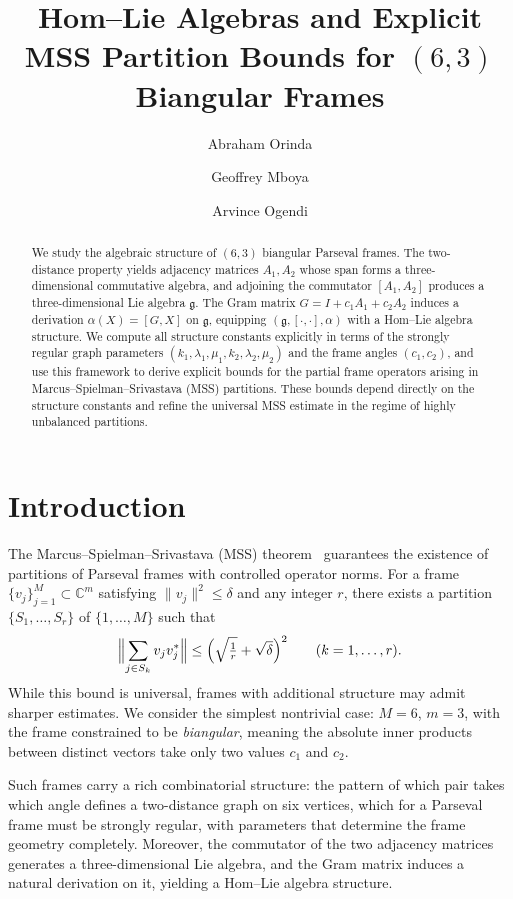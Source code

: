 \documentclass[a4paper]{amsart}
\title{Hom--Lie Algebras and Explicit MSS Partition Bounds for $(6,3)$ Biangular Frames}
\author{Abraham Orinda}
\author{Geoffrey Mboya}
\author{Arvince Ogendi}
\theoremstyle{plain}
\theoremstyle{definition}
\theoremstyle{remark}
\newcommand{\C}{\mathbb{C}}                    %
\newcommand{\g}{\mathfrak{g}}
\begin{document}
	\begin{abstract}
		We study the algebraic structure of $(6,3)$ biangular Parseval frames. The two-distance property yields adjacency matrices $A_1,A_2$ whose span forms a three-dimensional commutative algebra, and adjoining the commutator $[A_1,A_2]$ produces a three-dimensional Lie algebra $\g$. The Gram matrix $G = I + c_1 A_1 + c_2 A_2$ induces a derivation $\alpha(X) = [G,X]$ on $\g$, equipping $(\g, [\cdot,\cdot], \alpha)$ with a Hom--Lie algebra structure. We compute all structure constants explicitly in terms of the strongly regular graph parameters $(k_1,\lambda_1,\mu_1,k_2,\lambda_2,\mu_2)$ and the frame angles $(c_1,c_2)$, and use this framework to derive explicit bounds for the partial frame operators arising in Marcus--Spielman--Srivastava (MSS) partitions. These bounds depend directly on the structure constants and refine the universal MSS estimate in the regime of highly unbalanced partitions.
	\end{abstract}
	
	
	\maketitle
	
	\section{Introduction}
	\label{sec:introduction}
	
	The Marcus--Spielman--Srivastava (MSS) theorem~\cite{MSS} guarantees the existence of partitions of Parseval frames with controlled operator norms. For a frame $\{v_j\}_{j=1}^M \subset \C^m$ satisfying $\|v_j\|^2 \le \delta$ and any integer $r$, there exists a partition $\{S_1,\dots,S_r\}$ of $\{1,\dots,M\}$ such that
	\begin{equation}
		\Bigl\|\sum_{j\in S_k} v_jv_j^*\Bigr\| \le \Bigl(\sqrt{\tfrac1r}+\sqrt{\delta}\Bigr)^2\qquad (k=1,\dots,r). \label{eq:mss}
	\end{equation}
	While this bound is universal, frames with additional structure may admit sharper estimates. We consider the simplest nontrivial case: $M=6$, $m=3$, with the frame constrained to be {\em biangular}, meaning the absolute inner products between distinct vectors take only two values $c_1$ and $c_2$.
	
	Such frames carry a rich combinatorial structure: the pattern of which pair takes which angle defines a two-distance graph on six vertices, which for a Parseval frame must be strongly regular, with parameters that determine the frame geometry completely. Moreover, the commutator of the two adjacency matrices generates a three-dimensional Lie algebra, and the Gram matrix induces a natural derivation on it, yielding a Hom--Lie algebra structure.
	
\end{document}
